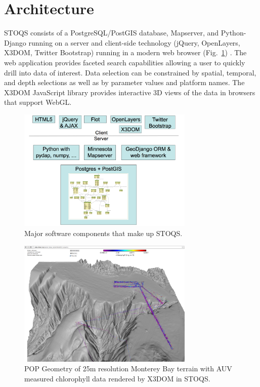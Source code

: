 \documentclass[annualconference]{acmsiggraph}  %
\begin{document}
\section{Architecture}

STOQS consists of a PostgreSQL/PostGIS database, Mapserver, and Python-Django running on a server and client-side technology (jQuery, OpenLayers, X3DOM, Twitter Bootstrap) running in a modern web browser (Fig.~\ref{fig:STOQSArch}) . The web application provides faceted search capabilities allowing a user to quickly drill into data of interest. Data selection can be constrained by spatial, temporal, and depth selections as well as by parameter values and platform names. The X3DOM JavaScript library provides interactive 3D views of the data in browsers that support WebGL.  

\begin{figure}[htbp]
\centering
\includegraphics[width=3.3in]{STOQS_Architecture_withX3DOM.png}
\caption{Major software components that make up STOQS.}
\label{fig:STOQSArch}
\end{figure}




\begin{figure}[htbp]
\centering
\includegraphics[width=3.3in]{Monterey25_lrauvs.png}
\caption{POP Geometry of 25m resolution Monterey Bay terrain with AUV measured chlorophyll data rendered by X3DOM in STOQS.}
\label{fig:Monterey25_lrauvs}
\end{figure}
\end{document}
